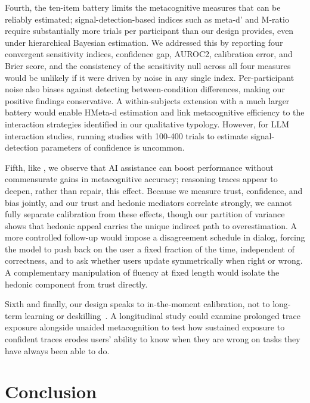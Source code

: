 \documentclass[manuscript, anonymous=false,authorversion,review=false]{acmart}
\begin{document}
Fourth, the ten-item battery limits the metacognitive measures that can be reliably estimated; signal-detection-based indices such as meta-d' and M-ratio \cite{rahnev2025comprehensive} require substantially more trials per participant than our design provides, even under hierarchical Bayesian estimation. We addressed this by reporting four convergent sensitivity indices, confidence gap, AUROC2, calibration error, and Brier score, and the consistency of the sensitivity null across all four measures would be unlikely if it were driven by noise in any single index. Per-participant noise also biases against detecting between-condition differences, making our positive findings conservative. A within-subjects extension with a much larger battery would enable HMeta-d estimation and link metacognitive efficiency to the interaction strategies identified in our qualitative typology. However, for LLM interaction studies, running studies with 100-400 trials to estimate signal-detection parameters of confidence is uncommon. 

Fifth, like \citet{FERNANDES2026108779}, we observe that AI assistance can boost performance without commensurate gains in metacognitive accuracy; reasoning traces appear to deepen, rather than repair, this effect. Because we measure trust, confidence, and bias jointly, and our trust and hedonic mediators correlate strongly, we cannot fully separate calibration from these effects, though our partition of variance shows that hedonic appeal carries the unique indirect path to overestimation. A more controlled follow-up would impose a disagreement schedule in dialog, forcing the model to push back on the user a fixed fraction of the time, independent of correctness, and to ask whether users update symmetrically when right or wrong. A complementary manipulation of fluency at fixed length would isolate the hedonic component from trust directly.

Sixth and finally, our design speaks to in-the-moment calibration, not to long-term learning or deskilling~\cite{bastani2024generative}. A longitudinal study could examine prolonged trace exposure alongside unaided metacognition to test how sustained exposure to confident traces erodes users' ability to know when they are wrong on tasks they have always been able to do.


\section{Conclusion}
\end{document}
